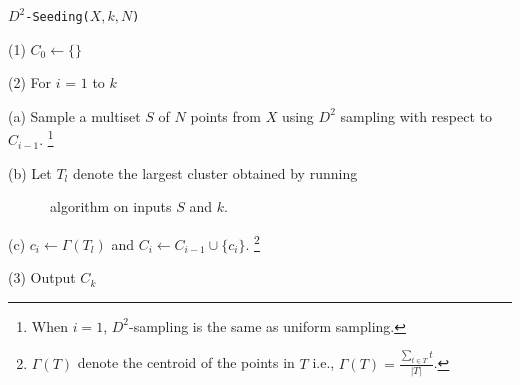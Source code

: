 \begin{center}
\begin{Algorithm}[h]
\begin{boxedminipage}{5.5in}
{\tt $D^2$-Seeding($X, k, N$)}

\hspace{0.1in} (1) $C_0 \leftarrow \{\}$

\hspace{0.1in} (2) For $i$ = $1$ to $k$

\hspace{0.3in} (a) Sample a multiset $S$ of $N$ points from $X$ using $D^2$ sampling with respect to $C_{i-1}$. \footnote{When $i=1$, $D^2$-sampling is the same as uniform sampling.}

\hspace{0.3in} (b) Let $T_l$ denote the largest cluster obtained by running \kmpp 

\hspace{0.3in}  \ \ \ \ \ \ algorithm on inputs $S$ and $k$.

\hspace{0.3in} (c) $c_i \leftarrow \Gamma(T_l)$ and $C_i \leftarrow C_{i-1} \cup \{c_i\}$. 
\footnote{$\Gamma(T)$ denote the centroid of the points in $T$ i.e., $\Gamma(T) = \frac{\sum_{t \in T} t}{|T|}$.}

\hspace{0.1in} (3) Output $C_k$
\end{boxedminipage}
\caption{Our seeding algorithm. $N$ is an input parameter that may be adjusted for performance/quality.}
\label{fig:seed}
\end{Algorithm}
\end{center}

\vspace{-0.4in}

